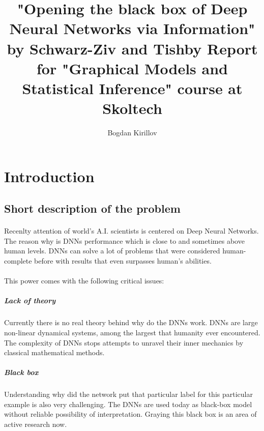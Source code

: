 \documentclass[a4paper,14pt]{extarticle}
\begin{document}
\title{
\vspace{5cm}
	"Opening the black box of Deep Neural Networks via Information" by Schwarz-Ziv and Tishby
	\newline
	\Large Report for "Graphical Models and Statistical Inference" course  at Skoltech}
\author{Bogdan Kirillov}

\maketitle


\newpage

\tableofcontents

\newpage

\section{Introduction}
\subsection{Short description of the problem}
\paragraph{}
Recenlty attention of world's A.I. scientists is centered on Deep Neural Networks. The reason why is DNNs performance which is close to\cite{esteva2017dermatologist} and sometimes above human levels. DNNs can solve a lot of problems that were considered human-complete before with results that even surpasses human's abilities\cite{lu2015surpassing}.
\paragraph{}
This power comes with the following critical issues: 
\subparagraph{Lack of theory}
Currently there is no real theory behind why do the DNNs work. DNNs are large non-linear dynamical systems, among the largest that humanity ever encountered. The complexity of DNNs stops attempts to unravel their inner mechanics by classical mathematical methods.
\subparagraph{Black box}
Understanding why did the network put that particular label for this particular example is also very challenging. The DNNs are used today as black-box model without reliable possibility of interpretation. Graying this black box is an area of active research now\cite{liu2017towards}.
\end{document}
